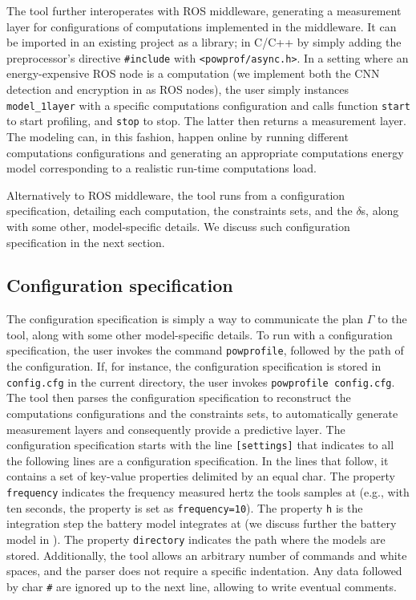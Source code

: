 The tool further interoperates with ROS middleware, generating a measurement layer for configurations of computations implemented in the middleware. It can be imported in an existing project as a library; in C/C++ by simply adding the preprocessor's directive {\small\tt \#include} with {\small\tt <powprof/async.h>}. In a setting where an energy-expensive ROS node is a computation (we implement both the CNN detection and encryption in  as ROS nodes), the user simply instances {\small\tt model\_1layer} with a specific computations configuration and calls function {\small\tt start} to start profiling, and {\small\tt stop} to stop. The latter then returns a measurement layer. The modeling can, in this fashion, happen online by running different computations configurations and generating an appropriate computations energy model corresponding to a realistic run-time computations load.

Alternatively to ROS middleware, the tool runs from a configuration specification, detailing each computation, the constraints sets, and the $\delta$s, along with some other, model-specific details. We discuss such configuration specification in the next section.

\subsection{Configuration specification}
\label{sec:conf-spec}

The configuration specification is simply a way to communicate the plan $\Gamma$ to the \powprof{} tool, along with some other model-specific details. To run \powprof{} with a configuration specification, the user invokes the command {\small\tt powprofile}, followed by the path of the configuration. If, for instance, the configuration specification is stored in {\small\tt config.cfg} in the current directory, the user invokes {\small\tt powprofile config.cfg}. The tool then parses the configuration specification to reconstruct the computations configurations and the constraints sets, to  automatically generate measurement layers and consequently provide a predictive layer. The configuration specification starts with the line {\small\tt [settings]} that indicates to \powprof{} all the following lines are a configuration specification. In the lines that follow, it contains a set of key-value properties delimited by an equal char. The property {\small\tt frequency} indicates the frequency measured hertz the tools samples at (e.g., with ten seconds, the property is set as {\small\tt frequency=10}). The property {\small\tt h} is the integration step the battery model integrates at (we discuss further the battery model in ). The property {\small\tt directory} indicates the path where the models are stored. Additionally, the tool allows an arbitrary number of commands and white spaces, and the parser does not require a specific indentation. Any data followed by char {\small\tt \#} are ignored up to the next line, allowing to write eventual comments.


